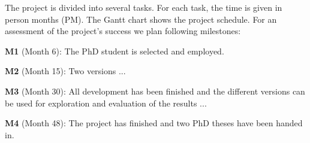 \documentclass[fleqn,12pt]{article}
\begin{document}
The project is divided into several tasks.
For each task, the time is given in person months (PM). The Gantt chart shows
the project schedule.
For an assessment of the project's success we plan following milestones:

\textbf{M1} (Month 6): The PhD student is selected and employed.

\textbf{M2} (Month 15): Two versions ...

\textbf{M3} (Month 30): All development has been finished and the different versions
can be used for exploration and evaluation of the results ...

\textbf{M4} (Month 48): The project has finished and two PhD theses have been handed in.
\end{document}
